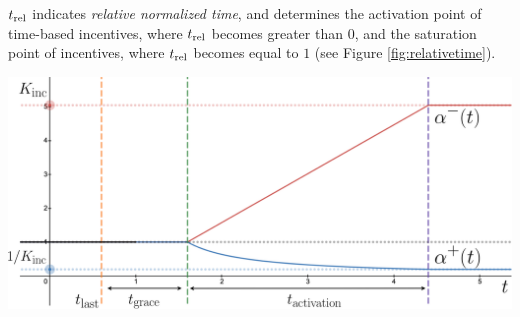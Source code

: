 \documentclass[9pt,oneside]{amsart}
\newenvironment{Figure}
  {\par\medskip\noindent\minipage{\linewidth}}
  {\endminipage\par\medskip}
\begin{document}
\begin{multicols}{2}
$t_\textnormal{rel}$ indicates \emph{relative normalized time}, and determines the activation point of time-based incentives, where $t_\textnormal{rel}$ becomes greater than $0$, and the saturation point of incentives, where $t_\textnormal{rel}$ becomes equal to $1$ (see Figure \ref{fig:relativetime}).

\begin{Figure}
 \centering
 \includegraphics[width=0.9\linewidth]{fig/incentive_graph.png}
\label{fig:incentive_multiplier_graphs}
\end{Figure}

\end{multicols}
\end{document}
